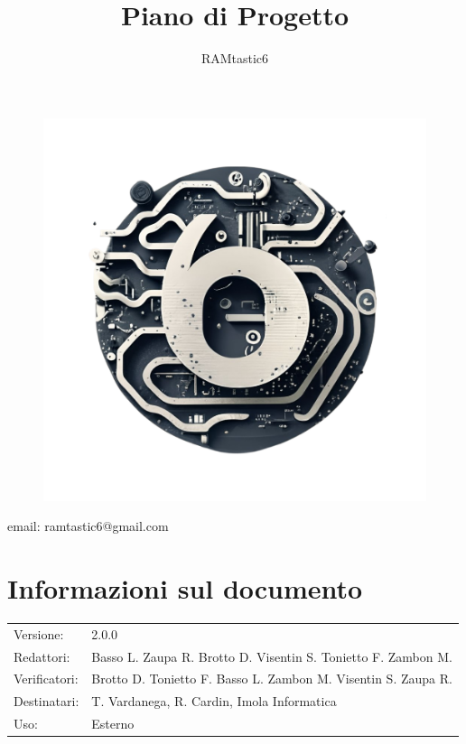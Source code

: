 \documentclass[12pt, oneside]{article}
\author{RAMtastic6}
\begin{document}
\thispagestyle{empty}
\title{Piano di Progetto}
\maketitle
\begin{figure}[h]
  \centering
  \includegraphics[scale=0.3]{logo.png}
\end{figure}
\begin{center}
    email: ramtastic6@gmail.com
\end{center}

\section*{Informazioni sul documento}
\begin{tabular}{ll}
Versione: & 2.0.0 \\
Redattori: & Basso L. Zaupa R. Brotto D. Visentin S. Tonietto F. Zambon M.\\
Verificatori: & Brotto D. Tonietto F. Basso L. Zambon M. Visentin S. Zaupa R. \\ 
Destinatari: & T. Vardanega, R. Cardin, Imola Informatica \\
Uso: & Esterno
\end{tabular}
\newpage
\end{document}
